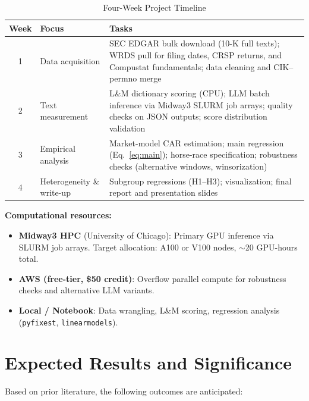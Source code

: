 \documentclass[12pt]{article}
\begin{document}
\begin{table}[H]
\centering
\caption{Four-Week Project Timeline}
\renewcommand{\arraystretch}{1.35}
\begin{tabularx}{\textwidth}{c l X}
\toprule
\textbf{Week} & \textbf{Focus} & \textbf{Tasks} \\
\midrule
1 & Data acquisition
  & SEC EDGAR bulk download (10-K full texts); WRDS pull for filing dates,
    CRSP returns, and Compustat fundamentals; data cleaning and CIK--permno
    merge \\
2 & Text measurement
  & L\&M dictionary scoring (CPU); LLM batch inference via Midway3 SLURM job
    arrays; quality checks on JSON outputs; score distribution validation \\
3 & Empirical analysis
  & Market-model CAR estimation; main regression (Eq.\ \ref{eq:main});
    horse-race specification; robustness checks (alternative windows,
    winsorization) \\
4 & Heterogeneity \& write-up
  & Subgroup regressions (H1--H3); visualization; final report and
    presentation slides \\
\bottomrule
\end{tabularx}
\end{table}

\noindent\textbf{Computational resources:}
\begin{itemize}[leftmargin=1.5em, noitemsep]
    \item \textbf{Midway3 HPC} (University of Chicago): Primary GPU inference
    via SLURM job arrays. Target allocation: A100 or V100 nodes, $\sim$20
    GPU-hours total.
    \item \textbf{AWS (free-tier, \$50 credit)}: Overflow parallel compute for
    robustness checks and alternative LLM variants.
    \item \textbf{Local / Notebook}: Data wrangling, L\&M scoring, regression
    analysis (\texttt{pyfixest}, \texttt{linearmodels}).
\end{itemize}

\section{Expected Results and Significance}

Based on prior literature, the following outcomes are anticipated:
\end{document}

